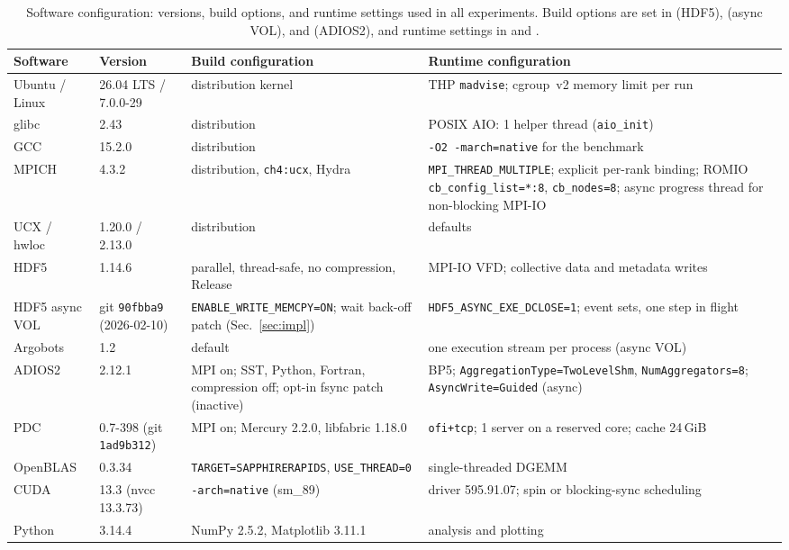 \begin{table}[t]
\centering
\small
\setlength{\tabcolsep}{4pt}
\begin{tabular}{@{}l l p{} p{}@{}}
\toprule
Software & Version & Build configuration & Runtime configuration \\
\midrule
Ubuntu / Linux & 26.04 LTS / 7.0.0-29 & distribution kernel & THP \texttt{madvise}; cgroup~v2 memory limit per run \\
glibc & 2.43 & distribution & POSIX AIO: 1 helper thread (\texttt{aio\_init}) \\
GCC & 15.2.0 & distribution & \texttt{-O2 -march=native} for the benchmark \\
MPICH & 4.3.2 & distribution, \texttt{ch4:ucx}, Hydra & \texttt{MPI\_THREAD\_MULTIPLE}; explicit per-rank binding; ROMIO \texttt{cb\_config\_list=*:8}, \texttt{cb\_nodes=8}; async progress thread for non-blocking MPI-IO \\
UCX / hwloc & 1.20.0 / 2.13.0 & distribution & defaults \\
HDF5 & 1.14.6 & parallel, thread-safe, no compression, Release & MPI-IO VFD; collective data and metadata writes \\
HDF5 async VOL & git \texttt{90fbba9} (2026-02-10) & \texttt{ENABLE\_WRITE\_MEMCPY=ON}; wait back-off patch (Sec.~\ref{sec:impl}) & \texttt{HDF5\_ASYNC\_EXE\_DCLOSE=1}; event sets, one step in flight \\
Argobots & 1.2 & default & one execution stream per process (async VOL) \\
ADIOS2 & 2.12.1 & MPI on; SST, Python, Fortran, compression off; opt-in fsync patch (inactive) & BP5; \texttt{AggregationType=TwoLevelShm}, \texttt{NumAggregators=8}; \texttt{AsyncWrite=Guided} (async) \\
PDC & 0.7-398 (git \texttt{1ad9b312}) & MPI on; Mercury 2.2.0, libfabric 1.18.0 & \texttt{ofi+tcp}; 1 server on a reserved core; cache 24\,GiB \\
OpenBLAS & 0.3.34 & \texttt{TARGET=SAPPHIRERAPIDS}, \texttt{USE\_THREAD=0} & single-threaded DGEMM \\
CUDA & 13.3 (nvcc 13.3.73) & \texttt{-arch=native} (sm\_89) & driver 595.91.07; spin or blocking-sync scheduling \\
Python & 3.14.4 & NumPy 2.5.2, Matplotlib 3.11.1 & analysis and plotting \\
\bottomrule
\end{tabular}
\caption{Software configuration: versions, build options, and runtime settings
used in all experiments. Build options are set in \srcBuildHdf (HDF5),
\srcBuildVol (async VOL), and \srcBuildAdios (ADIOS2), and runtime settings in
\srcMatrixEnv and \srcAsyncEnv.}
\label{tab:sw}
\end{table}

